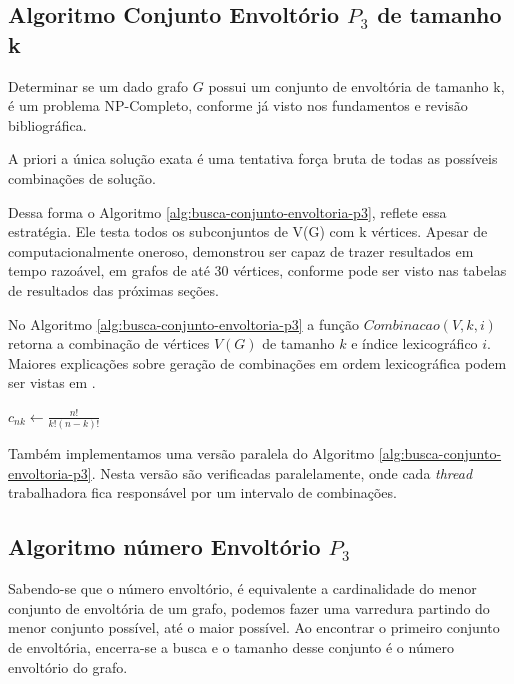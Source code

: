 \subsection{Algoritmo Conjunto Envoltório $P_3$ de tamanho k}

Determinar se um dado grafo $G$ possui um conjunto de envoltória de tamanho k,
é um problema NP-Completo, 
conforme já visto nos fundamentos e revisão bibliográfica.

A priori a única solução exata é uma tentativa força bruta
de todas as possíveis combinações de solução.

Dessa forma o Algoritmo \ref{alg:busca-conjunto-envoltoria-p3},
reflete essa estratégia. Ele testa todos os subconjuntos de V(G) com k vértices.
Apesar de computacionalmente oneroso, demonstrou ser capaz de trazer resultados em tempo razoável, 
em grafos de até 30 vértices, conforme pode ser visto nas tabelas de resultados das próximas seções. 

No Algoritmo \ref{alg:busca-conjunto-envoltoria-p3} a função $Combinacao(V, k, i)$
retorna a combinação de vértices $V(G)$ de tamanho $k$ e índice lexicográfico $i$.
Maiores explicações sobre geração de combinações em ordem lexicográfica podem ser vistas em \cite{Itai2001}.

 \begin{algorithm2e}
    \SetAlFnt{\tiny}
    \SetAlCapFnt{\small}
    \SetAlCapNameFnt{\small}
    \SetAlgoLined
    \DontPrintSemicolon
    \LinesNumbered
    \SetAlgoLined
    \BlankLine
    \BlankLine
    $c_{nk} \gets \frac{n!}{k!(n-k)!}$\\
\caption{$ConjuntoEnvoltoriaK(G(V,E),k)$}
\label{alg:busca-conjunto-envoltoria-p3}
\end{algorithm2e}

Também implementamos uma versão paralela do Algoritmo \ref{alg:busca-conjunto-envoltoria-p3}.
Nesta versão são verificadas paralelamente, 
onde cada \textit{thread} trabalhadora fica responsável por um intervalo de combinações.

\subsection{Algoritmo número Envoltório $P_3$}
Sabendo-se que o número envoltório, 
é equivalente a cardinalidade do menor conjunto de envoltória de um grafo,
podemos fazer uma varredura partindo do menor conjunto possível,
até o maior possível. Ao encontrar o primeiro conjunto de envoltória,
encerra-se a busca e o tamanho desse conjunto é o número envoltório do grafo.


